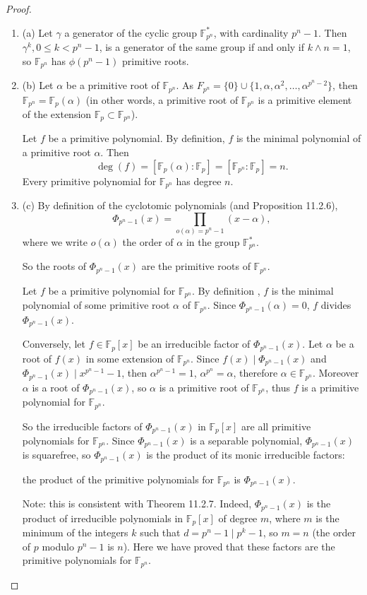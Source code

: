 \documentclass[11pt,a4paper]{article}
\newcommand{\be} {\begin{enumerate}}
\newcommand{\ee} {\end{enumerate}}
\newcommand{\F}{\mathbb{F}}
\begin{document}
\begin{proof}
\be
\item[(a)] Let $\gamma$ a generator of the cyclic group $\F_{p^n}^*$, with cardinality $p^n-1$. Then $\gamma^k, 0 \leq k <p^n-1$, is a generator of the same group if and only if $k \wedge n = 1$, so $\F_{p^n}$ has $\phi(p^n-1)$ primitive roots.

\item[(b)] Let $\alpha$ be a primitive root of $\F_{p^n}$. As $F_{p^n} = \{0\} \cup \{1,\alpha,\alpha^2,\ldots,\alpha^{p^n-2}\}$, then $\F_{p^n} = \F_p(\alpha)$ (in other words, a primitive root of $\F_{p^n}$ is a primitive element of the extension $\F_p \subset \F_{p^n}$).

Let $f$ be a primitive polynomial. By definition, $f$ is the minimal polynomial of a primitive root $\alpha$. Then
$$\deg(f) = [\F_p(\alpha) : \F_p] = [\F_{p^n}:\F_p] = n.$$
Every primitive polynomial for $\F_{p^n}$ has degree $n$.

\item[(c)] By definition of the cyclotomic polynomials (and Proposition 11.2.6), $$\Phi_{p^n-1}(x) =\prod_{o(\alpha) = p^n-1} (x- \alpha),$$
where we write $o(\alpha )$ the order of $\alpha$ in the group $\F_{p^n}^*$.

So the roots of  $\Phi_{p^n-1}(x) $  are the primitive roots of $\F_{p^n}$.

Let $f$ be a primitive polynomial for $\F_{p^n}$. By definition , $f$ is the minimal polynomial of some primitive root $\alpha$ of $\F_{p^n}$. Since $\Phi_{p^n-1}(\alpha) = 0$, $f$ divides $\Phi_{p^n-1}(x)$.

Conversely, let $f \in \F_p[x]$ be an irreducible factor of $\Phi_{p^n-1}(x)$. Let $\alpha$ be a root of $f(x)$ in some extension of $\F_{p^n}$. Since $f(x) \mid \Phi_{p^n-1}(x)$ and $\Phi_{p^n-1}(x) \mid x^{p^n-1}-1$, then $\alpha^{p^n-1} = 1$, $\alpha^{p^n} = \alpha$, therefore $\alpha \in \F_{p^n}$. Moreover $\alpha$ is a root of $\Phi_{p^n-1}(x)$, so $\alpha$ is a primitive root of $\F_{p^n}$, thus $f$ is a primitive polynomial for $\F_{p^n}$.

So the irreducible factors of $\Phi_{p^n-1}(x)$ in  $\F_p[x]$ are all primitive polynomials for $\F_{p^n}$. Since $\Phi_{p^n-1}(x)$ is a separable polynomial, $\Phi_{p^n-1}(x)$ is squarefree, so $\Phi_{p^n-1}(x)$ is the product of its monic irreducible factors:
\begin{center}
the product of the primitive polynomials for $\F_{p^n}$ is $\Phi_{p^n-1}(x)$.
\end{center}
Note: this is consistent with Theorem 11.2.7. Indeed, $\Phi_{p^n-1}(x)$ is the product of irreducible polynomials in $\F_p[x]$ of degree $m$, where $m$ is the minimum of the integers $k$ such that $d = p^n - 1 \mid p^k - 1$, so $m=n$ (the order of $p$ modulo $p^n-1$ is $n$). Here we have proved that these factors are the primitive polynomials for $\F_{p^n}$.
\ee
\end{proof}
\end{document}
